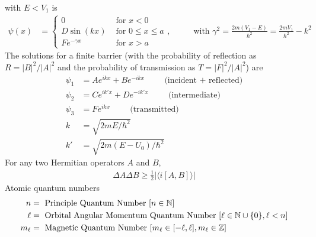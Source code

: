 with $E<V_1$ is
\begin{align}
	\psi(x) &=
	\begin{cases}
		0 & \textrm{ for } x<0 \\
		D\sin(kx) & \textrm{ for } 0 \leq x \leq a \\
		Fe^{-\gamma x} & \textrm{ for } x>a
	\end{cases}, \hspace{1cm}\textrm{ with } \gamma^2=\frac{2m(V_1-E)}{\hbar^2}=\frac{2mV_1}{\hbar^2}-k^2
\end{align}
The solutions for a finite barrier (with the probability of reflection as $R=|B|^2/|A|^2$ and the probability of transmission as $T=|F|^2/|A|^2$) are
\begin{align}
	\psi_1&=Ae^{ikx}+Be^{-ikx} \hspace{1cm}\textrm{(incident + reflected)} \\
	\psi_2&=Ce^{ik'x}+De^{-ik'x} \hspace{1cm}\textrm{(intermediate)}\\
	\psi_3&=Fe^{ikx} \hspace{1cm}\textrm{(transmitted)} \\
	k&=\sqrt{2mE/\hbar^2}\\
	k'&=\sqrt{2m(E-U_0)/\hbar^2}
\end{align}
For any two Hermitian operators $A$ and $B$,
\begin{align}
	\Delta A \Delta B \geq \frac{1}{2}| \langle i [A, B] \rangle |
\end{align}
Atomic quantum numbers
\begin{align}
	n &= \textrm{ Principle Quantum Number } [n \in \mathbb{N}]\\
	\ell &= \textrm{ Orbital Angular Momentum Quantum Number } [\ell \in \mathbb{N}\cup\{0\}, \ell < n] \\
	m_\ell &= \textrm{ Magnetic Quantum Number }[m_\ell \in [-\ell, \ell], m_\ell \in \mathbb{Z}]
\end{align}
